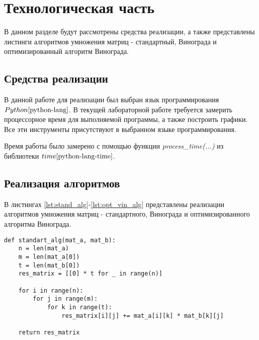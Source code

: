 \chapter{Технологическая часть}

В данном разделе будут рассмотрены средства реализации, а также представлены листинги алгоритмов умножения матриц - стандартный, Винограда и оптимизированный алгоритм Винограда.

\section{Средства реализации}
В данной работе для реализации был выбран язык программирования $Python \cite{python-lang}$. В текущей лабораторной работе требуется замерить процессорное время для выполняемой программы, а также построить графики. Все эти инструменты присутствуют в выбранном языке программирования.

Время работы было замерено с помощью функции \textit{process\_time(...)} из библиотеки $time \cite{python-lang-time}$.


\section{Реализация алгоритмов}

В листингах \ref{lst:stand_alg}-\ref{lst:opt_vin_alg} представлены реализации алгоритмов умножения матриц - стандартного, Винограда и оптимизированного алгоритма Винограда.

\begin{center}
    \captionsetup{justification=raggedright,singlelinecheck=off}
    \begin{lstlisting}[label=lst:stand_alg,caption=Стандартный алгоритм умножения матриц]
def standart_alg(mat_a, mat_b):
	n = len(mat_a)
	m = len(mat_a[0])
	t = len(mat_b[0])
	res_matrix = [[0] * t for _ in range(n)]

	for i in range(n):
		for j in range(m):
			for k in range(t):
				res_matrix[i][j] += mat_a[i][k] * mat_b[k][j]

	return res_matrix
\end{lstlisting}
\end{center}


